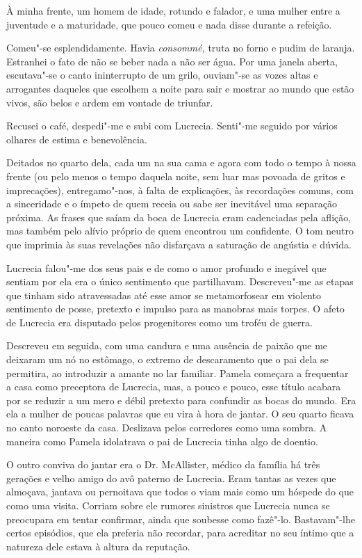 À minha frente, um homem de idade, rotundo e falador, e uma mulher entre
a juventude e a maturidade, que pouco comeu e nada disse durante a
refeição.

Comeu"-se esplendidamente. Havia \emph{consommé, }truta no forno e pudim
de laranja. Estranhei o fato de não se beber nada a não ser água. Por
uma janela aberta, escutava"-se o canto ininterrupto de um grilo,
ouviam"-se as vozes altas e arrogantes daqueles que escolhem a noite para
sair e mostrar ao mundo que estão vivos, são belos e ardem em vontade de
triunfar.

Recusei o café, despedi"-me e subi com Lucrecia. Senti"-me seguido por
vários olhares de estima e benevolência.

Deitados no quarto dela, cada um na sua cama e agora com todo o tempo à
nossa frente (ou pelo menos o tempo daquela noite, sem luar mas povoada
de gritos e imprecações), entregamo"-nos, à falta de explicações, às
recordações comuns, com a sinceridade e o ímpeto de quem receia ou sabe
ser inevitável uma separação próxima. As frases que saíam da boca de
Lucrecia eram cadenciadas pela aflição, mas também pelo alívio próprio
de quem encontrou um confidente. O tom neutro que imprimia às suas
revelações não disfarçava a saturação de angústia e dúvida.

Lucrecia falou"-me dos seus pais e de como o amor profundo e inegável
que sentiam por ela era o único sentimento que partilhavam. Descreveu"-me
as etapas que tinham sido atravessadas até esse amor se metamorfosear
em violento sentimento de posse, pretexto e impulso para as manobras
mais torpes. O afeto de Lucrecia era disputado pelos progenitores como
um troféu de guerra.

Descreveu em seguida, com uma candura e uma ausência de paixão que me
deixaram um nó no estômago, o extremo de descaramento que o pai dela se
permitira, ao introduzir a amante no lar familiar. Pamela começara a
frequentar a casa como preceptora de Lucrecia, mas, a pouco e pouco,
esse título acabara por se reduzir a um mero e débil pretexto para
confundir as bocas do mundo. Era ela a mulher de poucas palavras que eu
vira à hora de jantar. O seu quarto ficava no canto noroeste da casa.
Deslizava pelos corredores como uma sombra. A maneira como Pamela
idolatrava o pai de Lucrecia tinha algo de doentio.

O outro conviva do jantar era o Dr. McAllister, médico da família há
três gerações e velho amigo do avô paterno de Lucrecia. Eram tantas as
vezes que almoçava, jantava ou pernoitava que todos o viam mais como um hóspede do que como uma visita.
Corriam sobre ele rumores sinistros que Lucrecia nunca se preocupara em
tentar confirmar, ainda que soubesse como fazê"-lo. Bastavam"-lhe certos
episódios, que ela preferia não recordar, para acreditar no seu íntimo
que a natureza dele estava à altura da reputação.

